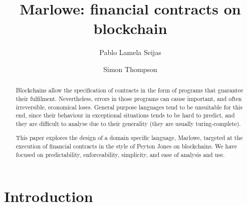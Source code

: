 \documentclass[
      acmsmall
    , screen
    , review=true
  ]{acmart}
\begin{document}
\title
  [Marlowe]
  {Marlowe: financial contracts on blockchain}

\author{Pablo Lamela Seijas}

\author{Simon Thompson}

\begin{abstract}

Blockchains allow the specification of contracts in the form of programs that guarantee their fulfilment. 
Nevertheless, errors in those programs can cause important, and often irreversible, economical loses. General purpose 
languages tend to be unsuitable for this end, since their behaviour in exceptional situations tends to be hard to 
predict, and they are difficult to analyse due to their generality (they are usually turing-complete).

This paper explores the design of a domain specific language, Marlowe, targeted at the execution of financial 
contracts in the style of Peyton Jones on blockchains. We have focused on predictability, enforceability, simplicity, 
and ease of analysis and use.

\end{abstract}



%
%


\maketitle


\section{Introduction}
\end{document}
